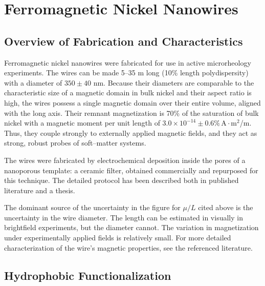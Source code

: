 \section{Ferromagnetic Nickel Nanowires}

\subsection{Overview of Fabrication and Characteristics}

Ferromagnetic nickel nanowires were fabricated for use in active microrheology experiments. The wires can be made 5--35 \textmu m long (10\% length polydispersity\cite{Hultgren2004,Hultgren2005}) with a diameter of $350 \pm 40$ nm\cite{Hultgren2004,Hultgren2005}. Because their diameters are comparable to the characteristic size of a magnetic domain in bulk nickel and their aspect ratio is high, the wires possess a single magnetic domain over their entire volume, aligned with the long axis. Their remnant magnetization is 70\% of the saturation of bulk nickel\cite{Sun1999} with a magnetic moment per unit length of $3.0 \times 10^{-14}\pm0.6\% \,\text{A}\cdot\text{m}^2$/\textmu m. Thus, they couple strongly to externally applied magnetic fields, and they act as strong, robust probes of soft--matter systems.

The wires were fabricated by electrochemical deposition inside the pores of a nanoporous template: a ceramic filter, obtained commercially and repurposed for this technique. The detailed protocol has been described both in published literature\cite{Chien2002} and a thesis\cite{TanaseThesis}.

The dominant source of the uncertainty in the figure for $\mu/L$ cited above is the uncertainty in the wire diameter. The length can be estimated in visually in brightfield experiments, but the diameter cannot. The variation in magnetization under experimentally applied fields is relatively small\cite{Hultgren2004,Hultgren2005}. For more detailed characterization of the wire's magnetic properties, see the referenced literature.

\subsection{Hydrophobic Functionalization}

